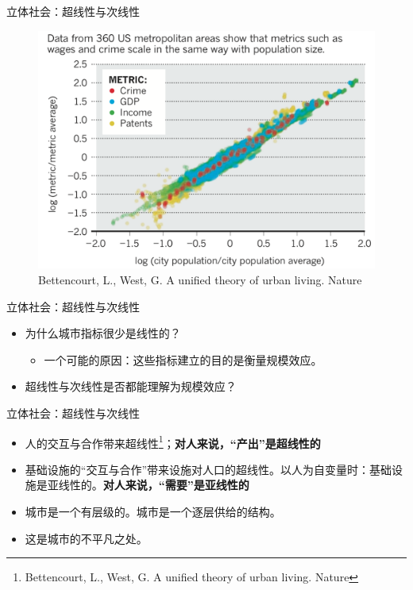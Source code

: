 \documentclass[utf8]{ctexbeamer}
\begin{document}
\begin{frame}{立体社会：超线性与次线性}
    \begin{figure}
        \centering
        \includegraphics[width = 0.8\linewidth]{图片/scaling.png}
        \caption{Bettencourt, L., West, G. A unified theory of urban living. Nature}
    \end{figure}
\end{frame}

\begin{frame}{立体社会：超线性与次线性}
    \begin{itemize}
        \item 为什么城市指标很少是线性的？
        \begin{itemize}
            \item 一个可能的原因：这些指标建立的目的是衡量规模效应。
        \end{itemize}
        \vspace{0.5cm}
        \item 超线性与次线性是否都能理解为规模效应？
    \end{itemize}
\end{frame}

\begin{frame}{立体社会：超线性与次线性}
    \begin{itemize}
        \item 人的交互与合作带来超线性\footnote{Bettencourt, L., West, G. A unified theory of urban living. Nature}；\textbf{对人来说，“产出”是超线性的}
        \item 基础设施的“交互与合作”带来设施对人口的超线性。以人为自变量时：基础设施是亚线性的。\textbf{对人来说，“需要”是亚线性的}
        \vspace{0.5cm}
        \item 城市是一个有层级的。城市是一个逐层供给的结构。
        \item 这是城市的不平凡之处。
    \end{itemize}
\end{frame}
\end{document}
